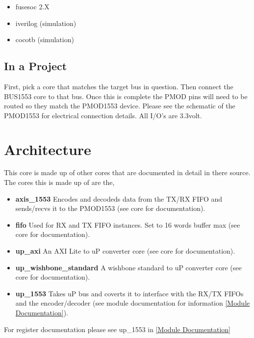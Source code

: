 \begin{itemize}
  \item fusesoc 2.X
  \item iverilog (simulation)
  \item cocotb (simulation)
\end{itemize}







\subsection{In a Project}
\par
First, pick a core that matches the target bus in question. Then connect the BUS1553 core to that bus. Once this is complete the PMOD pins will need
to be routed so they match the PMOD1553 device. Please see the schematic of the PMOD1553 for electrical connection details. All I/O's are 3.3volt.

\section{Architecture}
\par
This core is made up of other cores that are documented in detail in there source. The cores this is made up of are the,
\begin{itemize}
  \item \textbf{axis\_1553} Encodes and decodeds data from the TX/RX FIFO and sends/recvs it to the PMOD1553 (see core for documentation).
  \item \textbf{fifo} Used for RX and TX FIFO instances. Set to 16 words buffer max (see core for documentation).
  \item \textbf{up\_axi} An AXI Lite to uP converter core (see core for documentation).
  \item \textbf{up\_wishbone\_standard} A wishbone standard to uP converter core (see core for documentation).
  \item \textbf{up\_1553} Takes uP bus and coverts it to interface with the RX/TX FIFOs and the encoder/decoder (see module documentation for information \ref{Module Documentation}).
\end{itemize}

For register documentation please see up\_1553 in \ref{Module Documentation}

